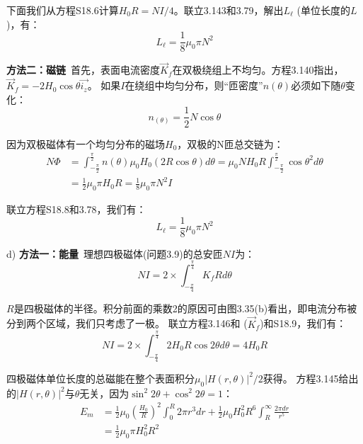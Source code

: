 下面我们从方程S18.6计算$H_0R=NI/4$。联立3.143和3.79，解出$L_\ell$ (单位长度的$L$)，有：
 \begin{equation}%
L_\ell=\frac{1}{8}\mu_0\pi N^2
\end{equation}

\textbf{方法二：磁链}\ 首先，表面电流密度$\vec{K}_f$在双极绕组上不均匀。方程3.140指出，$\vec{K}_f=-2H_0\cos\theta\vec{i_z}$。
如果$I$在绕组中均匀分布，则“匝密度”$n(\theta)$必须如下随$\theta$变化：
\begin{equation}%
n_(\theta)=\frac{1}{2}N\cos\theta
\end{equation}

因为双极磁体有一个均匀分布的磁场$H_0$，双极的N匝总交链为：
\begin{equation}%
\begin{split}
N\Phi&=\int_{-\frac{\pi}{2}}^{\frac{\pi}{2}}n(\theta)\mu_0H_0(2R\cos\theta)d\theta=
\mu_0NH_0R\int_{-\frac{\pi}{2}}^{\frac{\pi}{2}}\cos\theta^2d\theta \\
&=\frac{1}{2}\mu_0\pi H_0 R=\frac{1}{8}\mu_0\pi N^2I
\end{split}
\end{equation}

联立方程S18.8和3.78，我们有：
 \begin{equation}%
L_\ell=\frac{1}{8}\mu_0\pi N^2
\end{equation}

d) \textbf{方法一：能量}\ 理想四极磁体(问题3.9)的总安匝$NI$为：
\begin{equation}%
NI=2\times\int_{-\frac{\pi}{4}}^{\frac{\pi}{4}}K_fRd\theta
\end{equation}

$R$是四极磁体的半径。积分前面的乘数2的原因可由图3.35(b)看出，即电流分布被分到两个区域，我们只考虑了一极。
联立方程3.146和 ($\vec{K}_f$)和S18.9，我们有：
 \begin{equation}%
NI=2\times\int_{-\frac{\pi}{4}}^{\frac{\pi}{4}}2H_0R\cos 2\theta d\theta=4H_0R
\end{equation}

四极磁体单位长度的总磁能在整个表面积分$\mu_0|H(r,\theta)|^2/2$获得。
方程3.145给出的$|H(r,\theta)|^2$与$\theta$无关，因为$\sin^2 2\theta+\cos^2 2\theta=1$：
\begin{equation}%
\begin{split}
E_m&=\frac{1}{2}\mu_0(\frac{H_0}{R})^2\int_{0}^{R}2\pi r^3dr+\frac{1}{2}\mu_0H_{0}^{2}R^6\int_{R}^{\infty}\frac{2\pi dr}{r^5}\\
&=\frac{1}{2}\mu_0\pi H_{0}^{2}R^2
\end{split}
\end{equation}

